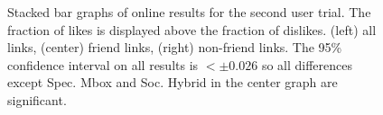 \begin{figure}[t!]
\caption{Stacked bar graphs of online results for the second
user trial.  The fraction of likes is displayed above 
the fraction of dislikes.  (left) all links, (center) friend links,
(right) non-friend links. The 95\% confidence interval on all 
results is $< \pm 0.026$ so all differences except Spec. Mbox
and Soc. Hybrid in the center graph are significant. }
\label{fig:online2}
\end{figure}

